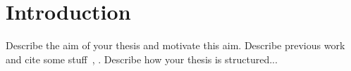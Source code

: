 %
%

\chapter{Introduction}
Describe the aim of your thesis and motivate this aim. Describe previous work and cite some stuff~\cite{Bay1, Ernst}, . Describe how your thesis is structured...
